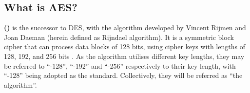 \subsection{What is AES?}

\textbf{ ()} is the successor to \gls{DES}, with the algorithm developed by Vincent Rijmen and Joan Daeman (herein defined as Rijndael algorithm). 
It is a symmetric block cipher that can process data blocks of 128 bits, using cipher keys with lengths of 128, 192, and 256 bits \cite{NIST_AES}.
As the algorithm utilises different key lengths, they may be referred to ``-128'', ``-192'' and ``-256'' respectively to their key length, with ``-128'' being adopted as the standard. 
Collectively, they will be referred as ``the  algorithm''.

